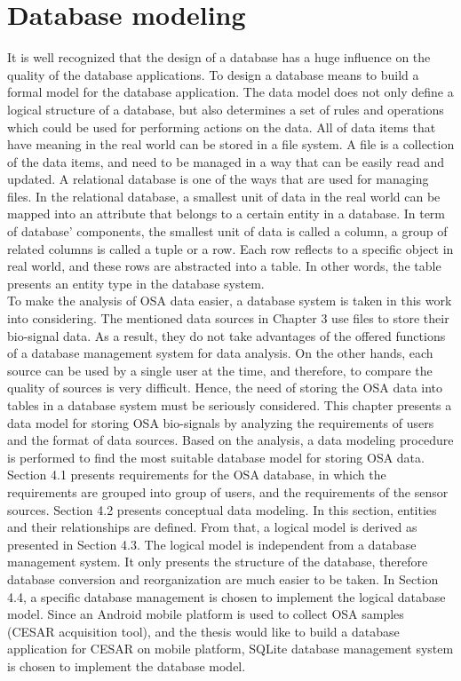 
\chapter{Database modeling} %

\label{Chapter4} %
It is well recognized that the design of a database has a huge influence on the quality of the database applications. To design a database means to build a formal model for the database application. The data model does not only define a logical structure of a database, but also determines a set of rules and operations which could be used for performing actions on the data. All of data items that have meaning in the real world can be stored in a file system. A file is a collection of the data items, and need to be managed in a way that can be easily read and updated. A relational database is one of the ways that are used for managing files. In the relational database, a smallest unit of data in the real world can be mapped into an attribute that belongs to a certain entity in a database. In term of database’ components, the smallest unit of data is called a column, a group of related columns is called a tuple or a row. Each row reflects to a specific object in real world, and these rows are abstracted into a table. In other words, the table presents an entity type in the database system.\\
To make the analysis of OSA data easier, a database system is taken in this work into considering. The mentioned data sources in Chapter 3 use files to store their bio-signal data. As a result, they do not take advantages of the offered functions of a database management system for data analysis. On the other hands, each source can be used by a single user at the time, and therefore, to compare the quality of sources is very difficult. Hence, the need of storing the OSA data into tables in a database system must be seriously considered.
This chapter presents a data model for storing OSA bio-signals by analyzing the requirements of users and the format of data sources. Based on the analysis, a data modeling procedure is performed to find the most suitable database model for storing OSA data.\\
Section 4.1 presents requirements for the OSA database, in which the requirements are grouped into group of users, and the requirements of the sensor sources. Section 4.2 presents conceptual data modeling. In this section, entities and their relationships are defined. From that, a logical model is derived as presented in Section 4.3. The logical model is independent from a database management system. It only presents the structure of the database, therefore database conversion and reorganization are much easier to be taken. In Section 4.4, a specific database management is chosen to implement the logical database model. Since an Android mobile platform is used to collect OSA samples (CESAR acquisition tool), and the thesis would like to build a database application for CESAR on mobile platform, SQLite database management system is chosen to implement the database model.
